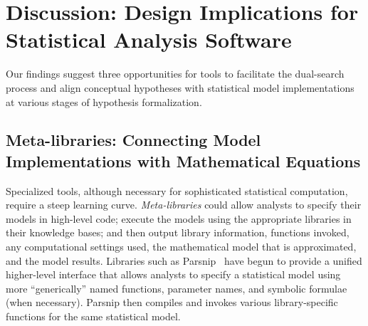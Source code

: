 \section{Discussion: Design Implications for Statistical Analysis Software} \label{sec:implications}
Our findings suggest three opportunities for tools to facilitate the dual-search
process and align conceptual hypotheses with statistical model implementations
at various stages of hypothesis formalization. 


\subsection{Meta-libraries: Connecting Model Implementations with Mathematical Equations}




Specialized tools, although necessary for sophisticated statistical computation,
require a steep learning curve. \textit{Meta-libraries} could allow analysts to
specify their models in high-level code; execute the models using the appropriate
libraries in their knowledge bases; and then output library information,
functions invoked, any computational settings used, the mathematical model that
is approximated, and the model results. Libraries such as
Parsnip~\cite{parsnip} have begun to provide a unified higher-level interface
that allows analysts to specify a statistical model using more ``generically''
named functions, parameter names, and symbolic formulae (when necessary).
Parsnip then compiles and invokes various library-specific functions for the
same statistical model.

